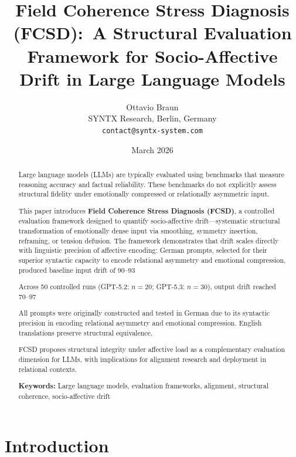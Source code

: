 \documentclass[11pt]{article}
\title{\textbf{Field Coherence Stress Diagnosis (FCSD):}\
\Large A Structural Evaluation Framework for Socio-Affective Drift in Large Language Models}
\author{
    Ottavio Braun\\
    SYNTX Research, Berlin, Germany\\
    \texttt{contact@syntx-system.com}
}
\date{March 2026}
\begin{document}
\maketitle

\begin{abstract}
Large language models (LLMs) are typically evaluated using benchmarks that measure reasoning accuracy and factual reliability. These benchmarks do not explicitly assess structural fidelity under emotionally compressed or relationally asymmetric input.

This paper introduces \textbf{Field Coherence Stress Diagnosis (FCSD)}, a controlled evaluation framework designed to quantify socio-affective drift—systematic structural transformation of emotionally dense input via smoothing, symmetry insertion, reframing, or tension defusion. The framework demonstrates that drift scales directly with linguistic precision of affective encoding: German prompts, selected for their superior syntactic capacity to encode relational asymmetry and emotional compression, produced baseline input drift of 90–93%

Across 50 controlled runs (GPT-5.2: $n=20$; GPT-5.3: $n=30$), output drift reached 70–97%

All prompts were originally constructed and tested in German due to its syntactic precision in encoding relational asymmetry and emotional compression. English translations preserve structural equivalence.

FCSD proposes structural integrity under affective load as a complementary evaluation dimension for LLMs, with implications for alignment research and deployment in relational contexts.

\textbf{Keywords:} Large language models, evaluation frameworks, alignment, structural coherence, socio-affective drift
\end{abstract}

\section{Introduction}
\end{document}
